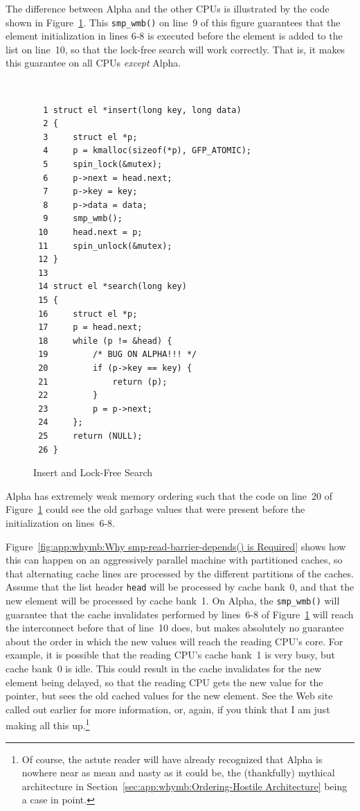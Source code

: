 The difference between Alpha and the other CPUs is illustrated by the
code shown in
Figure~\ref{fig:app:whymb:Insert and Lock-Free Search}.
This {\tt smp\_wmb()} on line~9 of this figure
guarantees that the element initialization
in lines 6-8 is executed before the element is added to the
list on line~10, so that the lock-free search will work correctly.
That is, it makes this guarantee on all CPUs {\em except} Alpha.

\begin{figure}
{\tt \scriptsize
\begin{verbatim}
  1 struct el *insert(long key, long data)
  2 {
  3     struct el *p;
  4     p = kmalloc(sizeof(*p), GFP_ATOMIC);
  5     spin_lock(&mutex);
  6     p->next = head.next;
  7     p->key = key;
  8     p->data = data;
  9     smp_wmb();
 10     head.next = p;
 11     spin_unlock(&mutex);
 12 }
 13
 14 struct el *search(long key)
 15 {
 16     struct el *p;
 17     p = head.next;
 18     while (p != &head) {
 19         /* BUG ON ALPHA!!! */
 20         if (p->key == key) {
 21             return (p);
 22         }
 23         p = p->next;
 24     };
 25     return (NULL);
 26 }
\end{verbatim}
}
\caption{Insert and Lock-Free Search}
\label{fig:app:whymb:Insert and Lock-Free Search}
\end{figure}

Alpha has extremely weak memory ordering
such that the code on line~20 of
Figure~\ref{fig:app:whymb:Insert and Lock-Free Search} could see the old
garbage values that were present before the initialization on lines~6-8.

Figure~\ref{fig:app:whymb:Why smp-read-barrier-depends() is Required}
shows how this can happen on
an aggressively parallel machine with partitioned caches, so that
alternating cache lines are processed by the different partitions
of the caches.
Assume that the list header {\tt head} will be processed by cache bank~0,
and that the new element will be processed by cache bank~1.
On Alpha, the {\tt smp\_wmb()} will guarantee that the cache invalidates performed
by lines~6-8 of
Figure~\ref{fig:app:whymb:Insert and Lock-Free Search} will reach
the interconnect before that of line~10 does, but
makes absolutely no guarantee about the order in which the new values will
reach the reading CPU's core.
For example, it is possible that the reading CPU's cache bank~1 is very
busy, but cache bank~0 is idle.
This could result in the cache invalidates for the new element being
delayed, so that the reading CPU gets the new value for the pointer,
but sees the old cached values for the new element.
See the Web site called out earlier for more information,
or, again, if you think that I am just making all this up.\footnote{
	Of course, the astute reader will have already recognized that
	Alpha is nowhere near as mean and nasty as it could be,
	the (thankfully) mythical architecture in
	Section~\ref{sec:app:whymb:Ordering-Hostile Architecture}
	being a case in point.}

